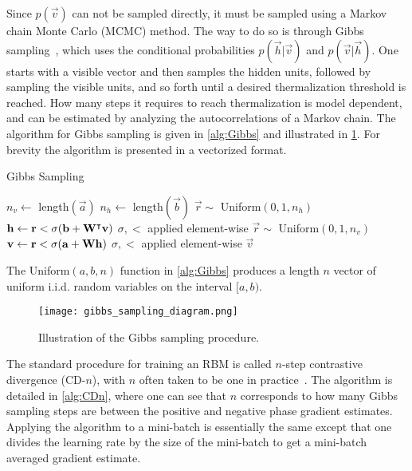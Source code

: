 Since \( p(\vec{v}) \) can not be sampled directly, it must be sampled using a Markov chain Monte Carlo (MCMC) method.
The way to do so is through Gibbs sampling~\cite{hinton_rbm_training}, which uses the conditional probabilities \( p(\vec{h}|\vec{v}) \) and \( p(\vec{v}|\vec{h}) \).
One starts with a visible vector and then samples the hidden units, followed by sampling the visible units, and so forth until a desired thermalization threshold is reached.
How many steps it requires to reach thermalization is model dependent, and can be estimated by analyzing the autocorrelations of a Markov chain.
The algorithm for Gibbs sampling is given in \cref{alg:Gibbs} and illustrated in \cref{fig:gibbs_sampling_diagram}.
For brevity the algorithm is presented in a vectorized format.

\begin{algorithm}
\caption{Gibbs Sampling}
\begin{algorithmic}[1]
        \State $n_v \gets$ length$(\vec{a})$
        \State $n_h \gets$ length$(\vec{b})$
            \State $\vec{r} \sim$ Uniform$(0, 1, n_h)$
            \State $\mathbf{h} \gets \mathbf{r} < \sigma(\mathbf{b} + \mathbf{W}^\intercal\mathbf{v})$
                \Comment $\sigma, <$ applied element-wise
            \State $\vec{r} \sim$ Uniform$(0, 1, n_v)$
            \State $\mathbf{v} \gets \mathbf{r} < \sigma(\mathbf{a} + \mathbf{W}\mathbf{h})$
                \Comment $\sigma, <$ applied element-wise
        \EndFor
        \State \Return $\vec{v}$
    \EndProcedure
\end{algorithmic}
\label{alg:Gibbs}
\end{algorithm}
The Uniform$(a, b, n)$ function in \cref{alg:Gibbs} produces a length \( n \) vector of uniform i.i.d. random variables on the interval $[a, b)$.

\begin{figure}
    \begin{center}
        \texttt{[image: gibbs\_sampling\_diagram.png]}
    \end{center}
    \caption{Illustration of the Gibbs sampling procedure.}
    \label{fig:gibbs_sampling_diagram}
\end{figure}

The standard procedure for training an RBM is called \( n \)-step contrastive divergence (CD-\( n \)), with \( n \) often taken to be one in practice~\cite{hinton_rbm_training}.
The algorithm is detailed in \cref{alg:CDn}, where one can see that \( n \) corresponds to how many Gibbs sampling steps are between the positive and negative phase gradient estimates.
Applying the algorithm to a mini-batch is essentially the same except that one divides the learning rate by the size of the mini-batch to get a mini-batch averaged gradient estimate.


